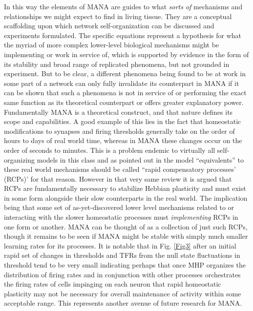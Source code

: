\documentclass[10pt,letterpaper]{article}
\begin{document}
In this way the elements of MANA are guides to what \emph{sorts of} mechanisms and relationships we might expect to find in living tissue. They are a conceptual scaffolding upon which network self-organization can be discussed and experiments formulated. The specific equations represent a hypothesis  for what the myriad of more complex lower-level biological mechanisms might be implementing or work in service of, which is supported by evidence in the form of its stability and broad range of replicated phenomena, but not grounded in experiment. But to be clear, a different phenomena being found to be at work in some part of a network can only fully invalidate its counterpart in MANA if it can be shown that such a phenomena is not in service of or performing the exact same function as its theoretical counterpart or offers greater explanatory power. Fundamentally MANA is a theoretical construct, and that nature defines its scope and capabilities. A good example of this lies in the fact that homeostatic modifications to synapses and firing thresholds generally take on the order of hours to days of real world time, whereas in MANA these changes occur on the order of seconds to minutes. This is a problem endemic to virtually all self-organizing models in this class \cite{lazar2009sorn, miner2016plasticity, litwin2014formation} and as pointed out in \cite{zenke2017hebbian} the model ``equivalents'' to these real world mechanisms should be called ``rapid compensatory processes' (RCPs)' for that reason. However in that very same review it is argued that RCPs are fundamentally necessary to stabilize Hebbian plasticity and must exist in some form alongside their slow counterparts in the real world. The implication being that some set of as-yet-discovered lower level mechanisms related to or interacting with the slower homeostatic processes must \emph{implementing} RCPs in one form or another. MANA can be thought of as a collection of just such RCPs, though it remains to be seen if MANA might be stable with simply much smaller learning rates for its processes. It is notable that in Fig. \ref{Fig3} after an initial rapid set of changes in thresholds and TFRs from the null state fluctuations in threshold tend to be very small indicating perhaps that once MHP organizes the distribution of firing rates and in conjunction with other processes orchestrates the firing rates of cells impinging on each neuron that rapid homeostatic plasticity may not be necessary for overall maintenance of activity within some acceptable range. This represents another avenue of future research for MANA. 
	 
\end{document}
